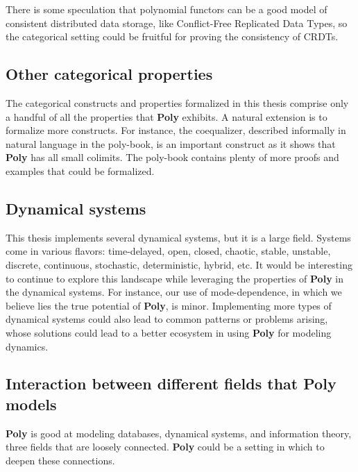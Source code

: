 There is some speculation that polynomial functors can be a good model of consistent distributed data storage, like Conflict-Free Replicated Data Types, so the categorical setting could be fruitful for proving the consistency of CRDTs.

\subsection{Other categorical properties}
The categorical constructs and properties formalized in this thesis comprise only a handful of all the properties that \textbf{Poly} exhibits. A natural extension is to formalize more constructs. For instance, the coequalizer, described informally in natural language in the poly-book, is an important construct as it shows that \textbf{Poly} has all small colimits. The poly-book contains plenty of more proofs and examples that could be formalized. 

\subsection{Dynamical systems}
This thesis implements several dynamical systems, but it is a large field. Systems come in various flavors: time-delayed, open, closed, chaotic, stable, unstable, discrete, continuous, stochastic, deterministic, hybrid, etc. It would be interesting to continue to explore this landscape while leveraging the properties of \textbf{Poly} in the dynamical systems. For instance, our use of mode-dependence, in which we believe lies the true potential of \textbf{Poly}, is minor. Implementing more types of dynamical systems could also lead to common patterns or problems arising, whose solutions could lead to a better ecosystem in using \textbf{Poly} for modeling dynamics.

\subsection{Interaction between different fields that Poly models}

\textbf{Poly} is good at modeling databases, dynamical systems, and information theory, three fields that are loosely connected. \textbf{Poly} could be a setting in which to deepen these connections.


